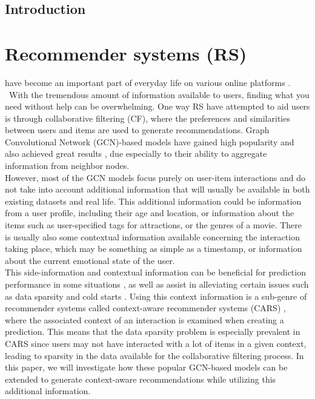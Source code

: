 \noindent
\section{Introduction}
\chapter{Recommender systems (RS)}\label{ch:introduction}
have become an important part of everyday life on various online platforms \cite{youtuberecommendation, industryperspective}.\\\
With the tremendous amount of information available to users, finding what you need without help can be overwhelming.
One way RS have attempted to aid users is through collaborative filtering (CF), where the preferences and similarities between users and items are used to generate recommendations. 
Graph Convolutional Network (GCN)-based models have gained high popularity and also achieved great results \cite{NGCF,LightGCN,KGAT}, due especially to their ability to aggregate information from neighbor nodes.\\
However, most of the GCN models focus purely on user-item interactions and do not take into account additional information that will usually be available in both existing datasets and real life.
This additional information could be information from a user profile, including their age and location, or information about the items such as user-specified tags for attractions, or the genres of a movie.
There is usually also some contextual information available concerning the interaction taking place, which may be something as simple as a timestamp, or information about the current emotional state of the user.\\
This side-information and contextual information can be beneficial for prediction performance in some situations \cite{ContextImportance, ContextImportance2, ContextImportance3}, as well as assist in alleviating certain issues such as data sparsity and cold starts \cite{SideInfoDefinition}.
Using this context information is a sub-genre of recommender systems called context-aware recommender systems (CARS) \cite{carsprogress}, where the associated context of an interaction is examined when creating a prediction.
This means that the data sparsity problem is especially prevalent in CARS since users may not have interacted with a lot of items in a given context, leading to sparsity in the data available for the collaborative filtering process.
In this paper, we will investigate how these popular GCN-based models can be extended to generate context-aware recommendations while utilizing this additional information.
